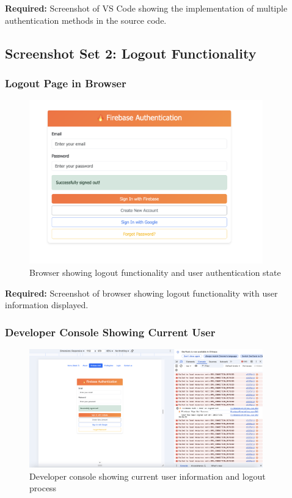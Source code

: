 \documentclass[11pt,a4paper]{article}
\begin{document}
\textbf{Required:} Screenshot of VS Code showing the implementation of multiple authentication methods in the source code.

\subsection{Screenshot Set 2: Logout Functionality}

\subsubsection{Logout Page in Browser}

 \begin{figure}[H]
     \centering
     \includegraphics[width=0.9\textwidth]{logout_browser.png}
     \caption{Browser showing logout functionality and user authentication state}
     \label{fig:logout_browser}
 \end{figure}

\textbf{Required:} Screenshot of browser showing logout functionality with user information displayed.

\subsubsection{Developer Console Showing Current User}

 \begin{figure}[H]
     \centering
     \includegraphics[width=0.9\textwidth]{logout_console.png}
     \caption{Developer console showing current user information and logout process}
     \label{fig:logout_console}
 \end{figure}
\end{document}
